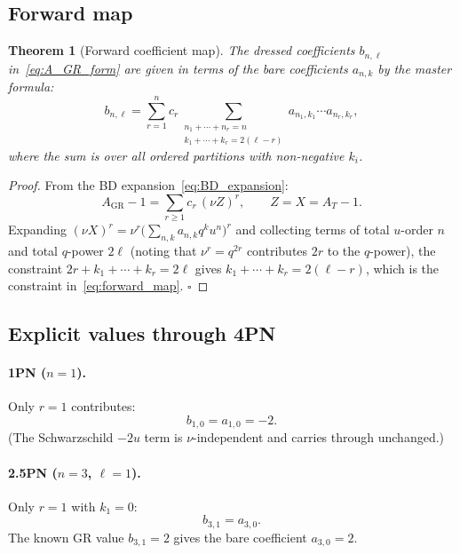 \documentclass[11pt,a4paper]{article}
\theoremstyle{plain}
\newtheorem{theorem}{Theorem}[section]
\theoremstyle{definition}
\theoremstyle{remark}
\newcommand{\GR}{\mathrm{GR}}
\begin{document}
\subsection{Forward map}

\begin{theorem}[Forward coefficient map]
\label{thm:forward}
The dressed coefficients $b_{n,\ell}$ in~\eqref{eq:A_GR_form} are given in terms
of the bare coefficients $a_{n,k}$ by the master formula:
\begin{equation}
  \boxed{
  b_{n,\ell}
  = \sum_{r=1}^{n} c_r
    \!\!\!\!\!\!\sum_{\substack{n_1+\cdots+n_r=n \\ k_1+\cdots+k_r=2(\ell-r)}}
    \!\!\!\!\!\! a_{n_1,k_1}\cdots a_{n_r,k_r},
  }
  \label{eq:forward_map}
\end{equation}
where the sum is over all ordered partitions with non-negative $k_i$.
\end{theorem}

\begin{proof}
From the BD expansion~\eqref{eq:BD_expansion}:
\begin{equation}
  A_\GR - 1 = \sum_{r\geq 1} c_r\,(\nu Z)^r,
  \qquad Z = X = A_T - 1.
\end{equation}
Expanding $(\nu X)^r = \nu^r\bigl(\sum_{n,k}a_{n,k}q^k u^n\bigr)^r$ and collecting
terms of total $u$-order $n$ and total $q$-power $2\ell$ (noting that
$\nu^r = q^{2r}$ contributes $2r$ to the $q$-power), the constraint
$2r + k_1+\cdots+k_r = 2\ell$ gives $k_1+\cdots+k_r = 2(\ell-r)$, which is
the constraint in~\eqref{eq:forward_map}. \qquad $\square$
\end{proof}

\subsection{Explicit values through 4PN}

\paragraph{1PN ($n=1$).} Only $r=1$ contributes:
\begin{equation}
  b_{1,0} = a_{1,0} = -2.
  \label{eq:b10}
\end{equation}
(The Schwarzschild $-2u$ term is $\nu$-independent and carries through unchanged.)

\paragraph{2.5PN ($n=3$, $\ell=1$).} Only $r=1$ with $k_1=0$:
\begin{equation}
  b_{3,1} = a_{3,0}.
  \label{eq:b31}
\end{equation}
The known GR value $b_{3,1} = 2$ gives the bare coefficient $a_{3,0} = 2$.
\end{document}
